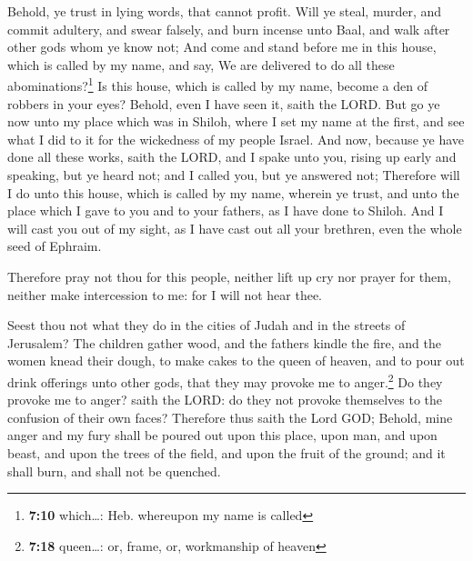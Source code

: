  Behold, ye trust in lying words, that cannot profit.
 Will ye steal, murder, and commit adultery, and swear
falsely, and burn incense unto Baal, and walk after other gods whom ye
know not;  And come and stand before me in this house,
which is called by my name, and say, We are delivered to do all these
abominations?\footnote{\textbf{7:10} which\ldots: Heb. whereupon my name
  is called}  Is this house, which is called by my name,
become a den of robbers in your eyes? Behold, even I have seen it, saith
the LORD.  But go ye now unto my place which was in
Shiloh, where I set my name at the first, and see what I did to it for
the wickedness of my people Israel.  And now, because ye
have done all these works, saith the LORD, and I spake unto you, rising
up early and speaking, but ye heard not; and I called you, but ye
answered not;  Therefore will I do unto this house, which
is called by my name, wherein ye trust, and unto the place which I gave
to you and to your fathers, as I have done to Shiloh. 
And I will cast you out of my sight, as I have cast out all your
brethren, even the whole seed of Ephraim.

 Therefore pray not thou for this people, neither lift up
cry nor prayer for them, neither make intercession to me: for I will not
hear thee.

 Seest thou not what they do in the cities of Judah and
in the streets of Jerusalem?  The children gather wood,
and the fathers kindle the fire, and the women knead their dough, to
make cakes to the queen of heaven, and to pour out drink offerings unto
other gods, that they may provoke me to anger.\footnote{\textbf{7:18}
  queen\ldots: or, frame, or, workmanship of heaven}  Do
they provoke me to anger? saith the LORD: do they not provoke themselves
to the confusion of their own faces?  Therefore thus
saith the Lord GOD; Behold, mine anger and my fury shall be poured out
upon this place, upon man, and upon beast, and upon the trees of the
field, and upon the fruit of the ground; and it shall burn, and shall
not be quenched.

